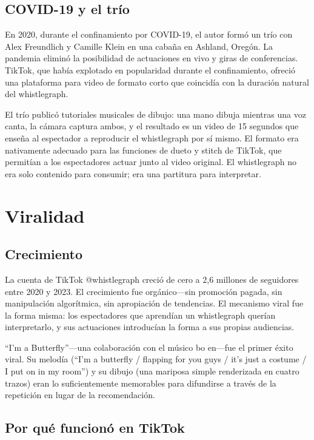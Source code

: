 \documentclass[10pt,letterpaper,twocolumn]{article}
\begin{document}
\subsection{COVID-19 y el trío}

En 2020, durante el confinamiento por COVID-19, el autor formó un trío con Alex Freundlich y Camille Klein en una cabaña en Ashland, Oregón. La pandemia eliminó la posibilidad de actuaciones en vivo y giras de conferencias. TikTok, que había explotado en popularidad durante el confinamiento, ofreció una plataforma para video de formato corto que coincidía con la duración natural del whistlegraph.

El trío publicó tutoriales musicales de dibujo: una mano dibuja mientras una voz canta, la cámara captura ambos, y el resultado es un video de 15 segundos que enseña al espectador a reproducir el whistlegraph por sí mismo. El formato era nativamente adecuado para las funciones de dueto y stitch de TikTok, que permitían a los espectadores actuar junto al video original. El whistlegraph no era solo contenido para consumir; era una partitura para interpretar.

\section{Viralidad}

\subsection{Crecimiento}

La cuenta de TikTok @whistlegraph creció de cero a 2,6 millones de seguidores entre 2020 y 2023. El crecimiento fue orgánico---sin promoción pagada, sin manipulación algorítmica, sin apropiación de tendencias. El mecanismo viral fue la forma misma: los espectadores que aprendían un whistlegraph querían interpretarlo, y sus actuaciones introducían la forma a sus propias audiencias.

``I'm a Butterfly''---una colaboración con el músico bo en---fue el primer éxito viral. Su melodía (``I'm a butterfly / flapping for you guys / it's just a costume / I put on in my room'') y su dibujo (una mariposa simple renderizada en cuatro trazos) eran lo suficientemente memorables para difundirse a través de la repetición en lugar de la recomendación.

\subsection{Por qué funcionó en TikTok}
\end{document}
